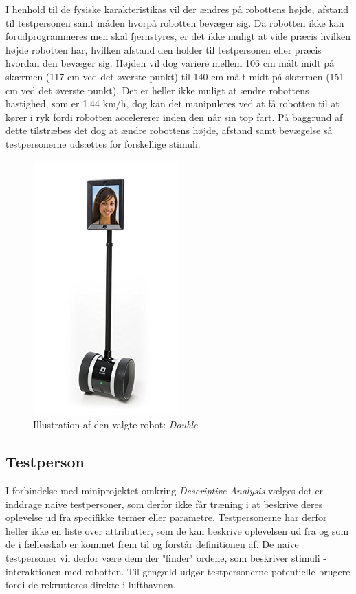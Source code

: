 I henhold til de fysiske karakteristikas vil der ændres på robottens højde, afstand til testpersonen samt måden hvorpå robotten bevæger sig. Da robotten ikke kan forudprogrammeres men skal fjernstyres, er det ikke muligt at vide præcis hvilken højde robotten har, hvilken afstand den holder til testpersonen eller præcis hvordan den bevæger sig. Højden vil dog variere mellem 106 cm målt midt på skærmen (117 cm ved det øverste punkt) til 140 cm målt midt på skærmen (151 cm ved det øverste punkt). Det er heller ikke muligt at ændre robottens hastighed, som er 1.44 km/h, dog kan det manipuleres ved at få robotten til at kører i ryk fordi robotten accelererer inden den når sin top fart. På baggrund af dette tilstræbes det dog at ændre robottens højde, afstand samt bevægelse så testpersonerne udsættes for forskellige stimuli. 
%
\begin{figure}[H]
\centering
\includegraphics[width = 0.5\textwidth]{Figure/Double} 
\caption{Illustration af den valgte robot: \textit{Double}.}
\label{fig:Double}
\end{figure}
\noindent
% 
%

\subsection*{Testperson}
\label{Testpersoner}
%
I forbindelse med miniprojektet omkring \textit{Descriptive Analysis} vælges det er inddrage naive testpersoner, som derfor ikke får træning i at beskrive deres oplevelse ud fra specifikke termer eller parametre. Testpersonerne har derfor heller ikke en liste over  attributter, som de kan beskrive oplevelsen ud fra og som de i fællesskab er kommet frem til og forstår definitionen af. De naive testpersoner vil derfor være dem der "finder" ordene, som beskriver stimuli - interaktionen med robotten. Til gengæld udgør testpersonerne potentielle brugere fordi de rekrutteres direkte i lufthavnen. 

